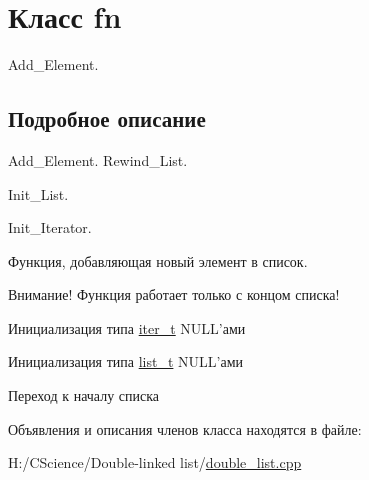 \hypertarget{classfn}{
\section{Класс fn}
\label{classfn}
}


Add\_\-Element.  




\subsection{Подробное описание}
Add\_\-Element. Rewind\_\-List.

Init\_\-List.

Init\_\-Iterator.

Функция, добавляющая новый элемент в список.

Внимание! Функция работает только с концом списка!

Инициализация типа \hyperlink{structiter__t}{iter\_\-t} NULL'ами

Инициализация типа \hyperlink{structlist__t}{list\_\-t} NULL'ами

Переход к началу списка 

Объявления и описания членов класса находятся в файле:\begin{DoxyCompactItemize}
\item 
H:/CScience/Double-\/linked list/\hyperlink{double__list_8cpp}{double\_\-list.cpp}\end{DoxyCompactItemize}
